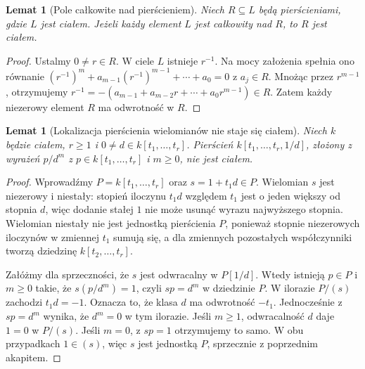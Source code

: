 \documentclass[11pt,a4paper,openany]{report}
\numberwithin{equation}{section}
\theoremstyle{plain}
\newtheorem{lemat}[twierdzenie]{Lemat}
\theoremstyle{definition}
\theoremstyle{remark}
\begin{document}
\begin{lemat}[Pole całkowite nad pierścieniem]
\label{lem:field-integral}
Niech $R\subseteq L$ będą pierścieniami, gdzie $L$ jest ciałem.
Jeżeli każdy element $L$ jest całkowity nad $R$, to $R$ jest ciałem.
\end{lemat}
\begin{proof}
Ustalmy $0\ne r\in R$. W ciele $L$ istnieje $r^{-1}$.
Na mocy założenia spełnia ono równanie
$(r^{-1})^m+a_{m-1}(r^{-1})^{m-1}+\cdots+a_0=0$
z $a_j\in R$. Mnożąc przez $r^{m-1}$, otrzymujemy
$ r^{-1}=-(a_{m-1}+a_{m-2}r+\cdots+a_0r^{m-1})\in R$.
Zatem każdy niezerowy element $R$ ma odwrotność w $R$.
\end{proof}

\begin{lemat}[Lokalizacja pierścienia wielomianów nie staje się ciałem]
\label{lem:localization-not-field}
Niech $k$ będzie ciałem, $r\ge1$ i
$0\ne d\in k[t_1,\dots,t_r]$.
Pierścień $k[t_1,\dots,t_r,1/d]$, złożony z wyrażeń
$p/d^m$ z $p\in k[t_1,\dots,t_r]$ i $m\ge0$,
nie jest ciałem.
\end{lemat}
\begin{proof}
Wprowadźmy $P=k[t_1,\dots,t_r]$ oraz $s=1+t_1d\in P$.
Wielomian $s$ jest niezerowy i niestały: stopień iloczynu
$t_1d$ względem $t_1$ jest o jeden większy od stopnia $d$,
więc dodanie stałej $1$ nie może usunąć wyrazu najwyższego stopnia.
Wielomian niestały nie jest jednostką pierścienia $P$,
ponieważ stopnie niezerowych iloczynów w zmiennej $t_1$
sumują się, a dla zmiennych pozostałych współczynniki tworzą
dziedzinę $k[t_2,\dots,t_r]$.

Załóżmy dla sprzeczności, że $s$ jest odwracalny w
$P[1/d]$. Wtedy istnieją $p\in P$ i $m\ge0$ takie, że
$s(p/d^m)=1$, czyli $sp=d^m$ w dziedzinie $P$.
W ilorazie $P/(s)$ zachodzi $t_1d=-1$.
Oznacza to, że klasa $d$ ma odwrotność $-t_1$.
Jednocześnie z $sp=d^m$ wynika, że $d^m=0$ w tym ilorazie.
Jeśli $m\ge1$, odwracalność $d$ daje $1=0$ w $P/(s)$.
Jeśli $m=0$, z $sp=1$ otrzymujemy to samo.
W obu przypadkach $1\in(s)$, więc $s$ jest jednostką $P$,
sprzecznie z poprzednim akapitem.
\end{proof}
\end{document}
